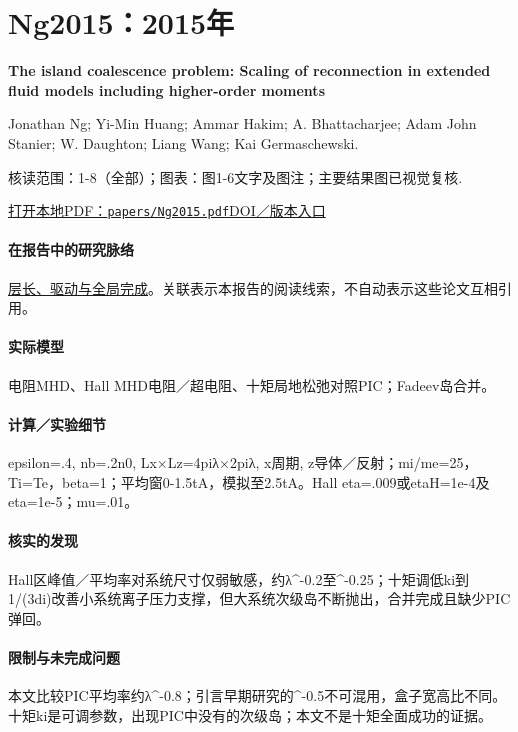 \section{Ng2015：2015年}\label{paper:Ng2015}

\textbf{The island coalescence problem: Scaling of reconnection in extended fluid models including higher-order moments}\citep{Ng2015}\

Jonathan Ng;  Yi-Min Huang;  Ammar Hakim;  A. Bhattacharjee;  Adam  John Stanier;  W. Daughton;  Liang Wang;  Kai Germaschewski.

\textsf{核读范围：}1-8（全部）；\textsf{图表：}图1-6文字及图注；主要结果图已视觉复核.

\href{run:papers/Ng2015.pdf}{打开本地PDF：\texttt{papers/Ng2015.pdf}}\quad\href{https://doi.org/10.1063/1.4935302}{DOI／版本入口}

\paragraph{在报告中的研究脉络}\hyperref[story:global]{层长、驱动与全局完成}。关联表示本报告的阅读线索，不自动表示这些论文互相引用。

\paragraph{实际模型}电阻MHD、Hall MHD电阻／超电阻、十矩局地松弛对照PIC；Fadeev岛合并。

\paragraph{计算／实验细节}epsilon=.4, nb=.2n0, Lx×Lz=4piλ×2piλ, x周期, z导体／反射；mi/me=25，Ti=Te，beta=1；平均窗0-1.5tA，模拟至2.5tA。Hall eta=.009或etaH=1e-4及eta=1e-5；mu=.01。

\paragraph{核实的发现}Hall区峰值／平均率对系统尺寸仅弱敏感，约λ\textasciicircum{}-0.2至\textasciicircum{}-0.25；十矩调低ki到1/(3di)改善小系统离子压力支撑，但大系统次级岛不断抛出，合并完成且缺少PIC弹回。

\paragraph{限制与未完成问题}本文比较PIC平均率约λ\textasciicircum{}-0.8；引言早期研究的\textasciicircum{}-0.5不可混用，盒子宽高比不同。十矩ki是可调参数，出现PIC中没有的次级岛；本文不是十矩全面成功的证据。

